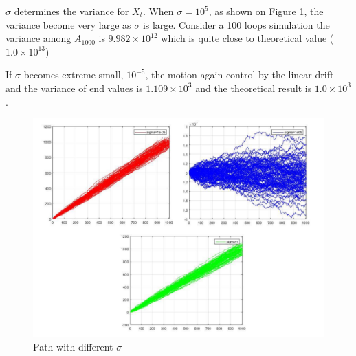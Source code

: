 $\sigma$ determines the variance for $X_t$. When $\sigma=10^{5}$, as shown on Figure \ref{fig:diffsigma}, the variance become very large as $\sigma$ is large. Consider a 100 loops simulation the variance among $A_{1000}$ is $9.982\times 10^{12}$ which is quite close to theoretical value ($1.0\times 10^{13}$)

If $\sigma$ becomes extreme small, $10^{-5}$, the motion again control by the linear drift and the variance of end values is $1.109\times 10^{3}$ and the theoretical result is $1.0\times 10^{3}$. 
\begin{figure}[H]
    \centering
    \includegraphics[scale=0.65]{figures/Task3/Diff_sigma.pdf}
    \caption{Path with different $\sigma$}
    \label{fig:diffsigma}
\end{figure}

